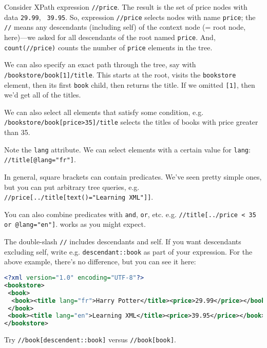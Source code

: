 \documentclass[11pt]{article}
\begin{document}
Consider XPath expression {\tt //price}. The
result is the set of price nodes with data {\tt 29.99}, {\tt
  39.95}. So, expression {\tt //price} selects nodes with name {\tt price};
the {\tt //} means any descendants (including self) of the context node (= root node, here)---we asked for all descendants of the root named {\tt price}.
And, {\tt count(//price)} counts the number of {\tt price} elements
in the tree.

We can also specify an exact path through the tree, say
with {\tt /bookstore/book[1]/title}. This starts at the root,
visits the {\tt bookstore} element, then its first {\tt book} child,
then returns the title. If we omitted {\tt [1]}, then we'd
get all of the titles.

We can also select all elements that satisfy some condition,
e.g. {\tt /bookstore/book[price>35]/title} selects the titles
of books with price greater than 35.

Note the {\tt lang} attribute. We can select elements with a
certain value for {\tt lang}: {\tt //title[@lang="fr"]}.

In general, square brackets can contain predicates. We've 
seen pretty simple ones, but you can put arbitrary tree queries,
e.g. {\tt //price[../title[text()="Learning XML"]]}.

You can also combine predicates with {\tt and}, {\tt or}, etc.
e.g. {\tt //title[../price < 35 or @lang="en"]}. 
{\tt *} works as you might expect.

The double-slash {\tt //} includes descendants and self.
If you want descendants excluding self, write 
e.g. {\tt descendant::book} as part of your expression.
For the above example, there's no difference, but you can see it
here:

\begin{lstlisting}[language=XML]
<?xml version="1.0" encoding="UTF-8"?>
<bookstore>
 <book>
  <book><title lang="fr">Harry Potter</title><price>29.99</price></book>
 </book>
 <book><title lang="en">Learning XML</title><price>39.95</price></book>
</bookstore>
\end{lstlisting}

Try {\tt //book[descendent::book]} versus {\tt //book[book]}.
\end{document}
